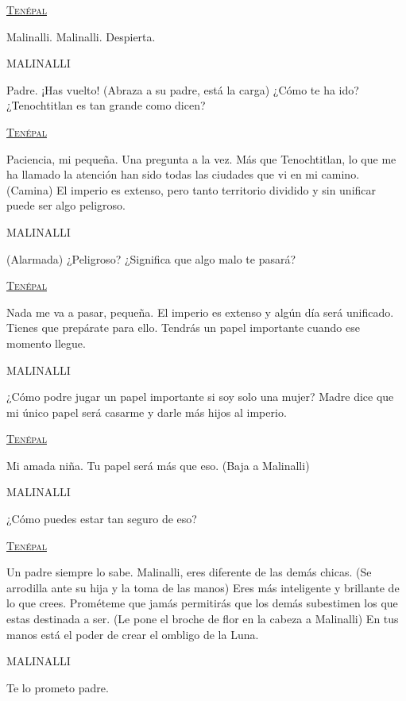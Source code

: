 \documentclass[11pt,letterpaper]{article}
\begin{document}
\begin{center}
\textsc{\underline{Tenépal }}
\\
\par
Malinalli. Malinalli. Despierta. 
\\
\par
MALINALLI
\\
\par
Padre. ¡Has vuelto! (Abraza a su padre, está la carga) ¿Cómo te ha ido? ¿Tenochtitlan es tan grande como dicen?
\\
\par 
\textsc{\underline{Tenépal }}
\\
\par
Paciencia, mi pequeña. Una pregunta a la vez. Más que Tenochtitlan, lo que me ha llamado la atención han sido todas las ciudades que vi en mi camino. (Camina) El imperio es extenso, pero tanto territorio dividido y sin unificar puede ser algo peligroso.
\\
\par
MALINALLI
\\
\par
(Alarmada) ¿Peligroso? ¿Significa que algo malo te pasará?
\\
\par
\textsc{\underline{Tenépal }}
\\
\par
Nada me va a pasar, pequeña. El imperio es extenso y algún día será unificado. Tienes que prepárate para ello. Tendrás un papel importante cuando ese momento llegue.
\\
\par
MALINALLI
\\
\par
¿Cómo podre jugar un papel importante si soy solo una mujer? Madre dice que mi único papel será casarme y darle más hijos al imperio.
\\
\par
\textsc{\underline{Tenépal }}
\\
\par
Mi amada niña. Tu papel será más que eso. (Baja a Malinalli)
\\
\par
MALINALLI
\\
\par
¿Cómo puedes estar tan seguro de eso?
\\
\par
\textsc{\underline{Tenépal }}
\\
\par
Un padre siempre lo sabe. Malinalli, eres diferente de las demás chicas. (Se arrodilla ante su hija y la toma de las manos) Eres más inteligente y brillante de lo que crees. Prométeme que jamás permitirás que los demás subestimen los que estas destinada a ser. (Le pone el broche de flor en la cabeza a Malinalli) En tus manos está el poder de crear el ombligo de la Luna.
\\
\par
MALINALLI
\\
\par
Te lo prometo padre. 
\end{center}
\end{document}
